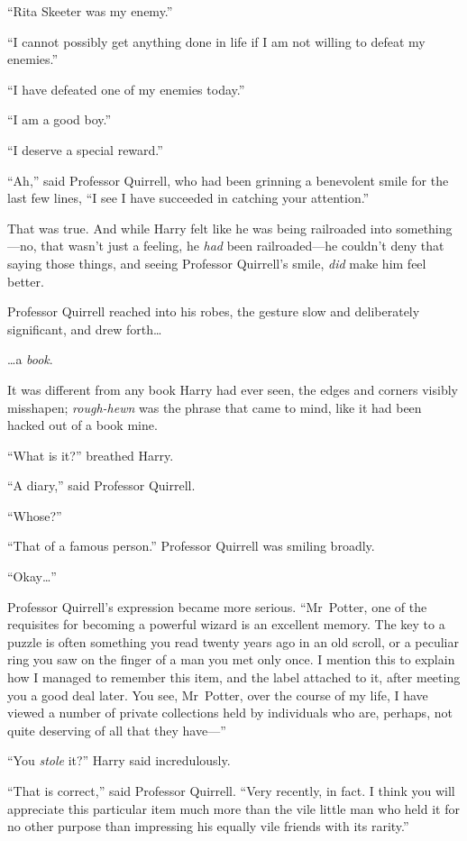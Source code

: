 “Rita Skeeter was my enemy.”

“I cannot possibly get anything done in life if I am not willing to defeat my enemies.”

“I have defeated one of my enemies today.”

“I am a good boy.”

“I deserve a special reward.”

“Ah,” said Professor Quirrell, who had been grinning a benevolent smile for the last few lines, “I see I have succeeded in catching your attention.”

That was true. And while Harry felt like he was being railroaded into something—no, that wasn’t just a feeling, he \emph{had} been railroaded—he couldn’t deny that saying those things, and seeing Professor Quirrell’s smile, \emph{did} make him feel better.

Professor Quirrell reached into his robes, the gesture slow and deliberately significant, and drew forth…

…a \emph{book}.

It was different from any book Harry had ever seen, the edges and corners visibly misshapen; \emph{rough-hewn} was the phrase that came to mind, like it had been hacked out of a book mine.

“What is it?” breathed Harry.

“A diary,” said Professor Quirrell.

“Whose?”

“That of a famous person.” Professor Quirrell was smiling broadly.

“Okay…”

Professor Quirrell’s expression became more serious. “Mr~Potter, one of the requisites for becoming a powerful wizard is an excellent memory. The key to a puzzle is often something you read twenty years ago in an old scroll, or a peculiar ring you saw on the finger of a man you met only once. I mention this to explain how I managed to remember this item, and the label attached to it, after meeting you a good deal later. You see, Mr~Potter, over the course of my life, I have viewed a number of private collections held by individuals who are, perhaps, not quite deserving of all that they have—”

“You \emph{stole} it?” Harry said incredulously.

“That is correct,” said Professor Quirrell. “Very recently, in fact. I think you will appreciate this particular item much more than the vile little man who held it for no other purpose than impressing his equally vile friends with its rarity.”

